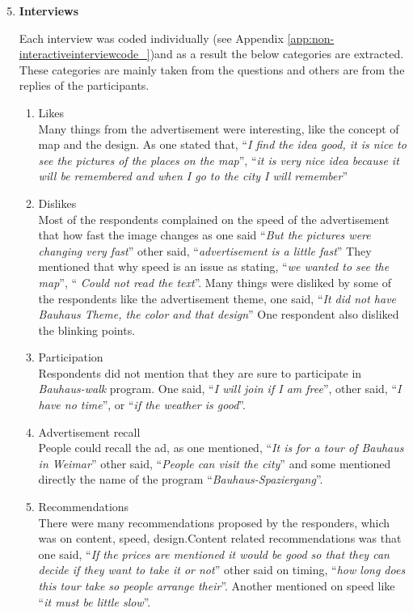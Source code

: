\begin{enumerate}
\setcounter{enumi}{4}

\item \textbf{Interviews} 

Each interview was coded individually (see Appendix \ref{app:non-interactiveinterviewcode_})and as a result the below categories are extracted. These categories are mainly taken from the questions and others are from the replies of the participants.


\begin{enumerate}
\item Likes \\
Many things from the advertisement were interesting, like the concept of map and the design. As one stated that, ``\emph{I find the idea good, it is nice to see the pictures of the places on the map}'', ``\emph{it is very nice idea because it will be remembered and when I go to the city I will remember}''

\item Dislikes \\
Most of the respondents complained on the speed of the advertisement that how fast the image changes as one said ``\emph{But the pictures were changing very fast}'' other said, ``\emph{advertisement is a little fast}'' They mentioned that why speed is an issue as stating, ``\emph{we wanted to see the map}'', ``\emph{ Could not read the text}''. Many things were disliked by some of the respondents like the advertisement theme, one said, ``\emph{It did not have Bauhaus Theme, the color and that design}'' One respondent also disliked the blinking points.

\item  Participation \\
Respondents did not mention that they are sure to participate in  \emph{Bauhaus-walk} program. One said, ``\emph{I will join if I am free}'', other said, ``\emph{I have no time}'', or ``\emph{if the weather is good}''.

\item  Advertisement recall \\
People could recall the ad, as one mentioned, ``\emph{It is for a tour of Bauhaus in Weimar}'' other said, ``\emph{People can visit the city}'' and some mentioned directly the name of the program ``\emph{Bauhaus-Spaziergang}''.

\item Recommendations \\
There were many recommendations proposed by the responders, which was on content, speed, design.Content related recommendations was that one said, ``\emph{If the prices are mentioned it would be good so that they can decide if they want to take it or not}'' other said on timing, ``\emph{how long does this tour take so people arrange their}''. Another mentioned on speed like ``\emph{it must be little slow}''.


\end{enumerate}
\end{enumerate}
